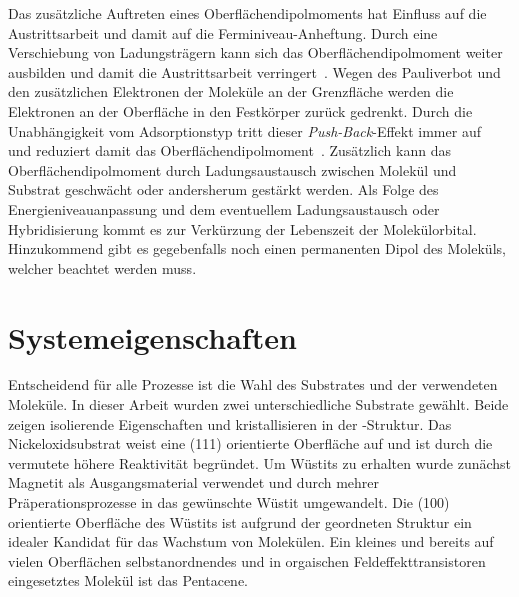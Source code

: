            Das zusätzliche Auftreten eines Oberflächendipolmoments hat Einfluss auf die Austrittsarbeit und damit auf die Ferminiveau-Anheftung.
            Durch eine Verschiebung von Ladungsträgern kann sich das Oberflächendipolmoment weiter ausbilden und damit die Austrittsarbeit verringert~\cite{5A_5}.
            Wegen des Pauliverbot und den zusätzlichen Elektronen der Moleküle an der Grenzfläche werden die Elektronen an der Oberfläche in den Festkörper zurück gedrenkt.
            Durch die Unabhängigkeit vom Adsorptionstyp tritt dieser \textit{Push-Back}-Effekt immer auf~\cite{IF_4} und reduziert damit das Oberflächendipolmoment~\cite{IF_1}.
            Zusätzlich kann das Oberflächendipolmoment durch Ladungsaustausch zwischen Molekül und Substrat geschwächt oder andersherum gestärkt werden.
            Als Folge des Energieniveauanpassung und dem eventuellem Ladungsaustausch oder Hybridisierung kommt es zur Verkürzung der Lebenszeit der Molekülorbital.
            Hinzukommend gibt es gegebenfalls noch einen permanenten Dipol des Moleküls, welcher beachtet werden muss.


    \section{Systemeigenschaften} \label{sec:Systeme}
        Entscheidend für alle Prozesse ist die Wahl des Substrates und der verwendeten Moleküle.
        In dieser Arbeit wurden zwei unterschiedliche Substrate gewählt.
        Beide zeigen isolierende Eigenschaften und kristallisieren in der -Struktur.
        Das Nickeloxidsubstrat weist eine (111) orientierte Oberfläche auf und ist durch die vermutete höhere Reaktivität begründet.
        Um Wüstits zu erhalten wurde zunächst Magnetit als Ausgangsmaterial verwendet und durch mehrer Präperationsprozesse in das gewünschte Wüstit umgewandelt.
        Die (100) orientierte Oberfläche des Wüstits ist aufgrund der geordneten Struktur ein idealer Kandidat für das Wachstum von Molekülen.
        Ein kleines und bereits auf vielen Oberflächen selbstanordnendes und in orgaischen Feldeffekttransistoren eingesetztes Molekül ist das Pentacene.

